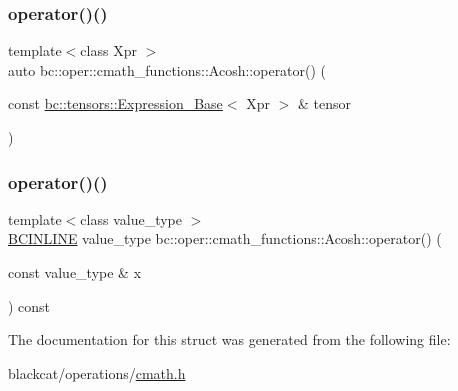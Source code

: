 \mbox{\label{structbc_1_1oper_1_1cmath__functions_1_1Acosh_a39b03c26fbdae12f411e9b4cc728259b}} 
\subsubsection{\texorpdfstring{operator()()}{operator()()}\hspace{0.1cm}{\footnotesize\ttfamily [2/3]}}
{\footnotesize\ttfamily template$<$class Xpr $>$ \\
auto bc\+::oper\+::cmath\+\_\+functions\+::\+Acosh\+::operator() (\begin{DoxyParamCaption}\item[{const \hyperlink{classbc_1_1tensors_1_1Expression__Base}{bc\+::tensors\+::\+Expression\+\_\+\+Base}$<$ Xpr $>$ \&}]{tensor }\end{DoxyParamCaption})\hspace{0.3cm}{\ttfamily [inline]}}

\mbox{\label{structbc_1_1oper_1_1cmath__functions_1_1Acosh_a9dbd67feb47d89029340f4eb6040afdd}} 
\subsubsection{\texorpdfstring{operator()()}{operator()()}\hspace{0.1cm}{\footnotesize\ttfamily [3/3]}}
{\footnotesize\ttfamily template$<$class value\+\_\+type $>$ \\
\hyperlink{common_8h_a6699e8b0449da5c0fafb878e59c1d4b1}{B\+C\+I\+N\+L\+I\+NE} value\+\_\+type bc\+::oper\+::cmath\+\_\+functions\+::\+Acosh\+::operator() (\begin{DoxyParamCaption}\item[{const value\+\_\+type \&}]{x }\end{DoxyParamCaption}) const\hspace{0.3cm}{\ttfamily [inline]}}



The documentation for this struct was generated from the following file\+:\begin{DoxyCompactItemize}
\item 
blackcat/operations/\hyperlink{cmath_8h}{cmath.\+h}\end{DoxyCompactItemize}
